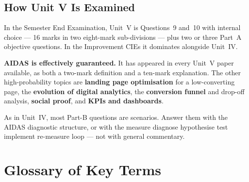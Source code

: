 \section*{How Unit V Is Examined}

\begin{keybox}
In the Semester End Examination, Unit~V is Questions~9 and~10 with internal
choice --- 16 marks in two eight-mark sub-divisions --- plus two or three Part~A
objective questions. In the Improvement CIEs it dominates alongside Unit~IV.

\smallskip
\textbf{AIDAS is effectively guaranteed.} It has appeared in every Unit~V paper
available, as both a two-mark definition and a ten-mark explanation. The other
high-probability topics are \textbf{landing page optimisation} for a
low-converting page, the \textbf{evolution of digital analytics}, the
\textbf{conversion funnel} and drop-off analysis, \textbf{social proof}, and
\textbf{KPIs and dashboards}.

\smallskip
As in Unit~IV, most Part-B questions are scenarios. Answer them with the AIDAS
diagnostic structure, or with the measure \ra{} diagnose \ra{} hypothesise \ra{}
test \ra{} implement \ra{} re-measure loop --- not with general commentary.
\end{keybox}

\chapter{Glossary of Key Terms}

